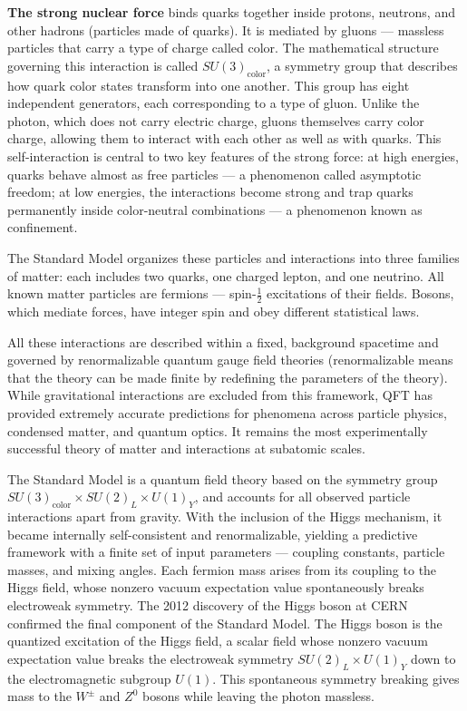 \textbf{The strong nuclear force} binds quarks together inside protons, neutrons, and other hadrons (particles made of quarks). It is mediated by gluons — massless particles that carry a type of charge called color. The mathematical structure governing this interaction is called \(SU(3)_\text{color}\), a symmetry group that describes how quark color states transform into one another. This group has eight independent generators, each corresponding to a type of gluon. Unlike the photon, which does not carry electric charge, gluons themselves carry color charge, allowing them to interact with each other as well as with quarks. This self-interaction is central to two key features of the strong force: at high energies, quarks behave almost as free particles — a phenomenon called asymptotic freedom; at low energies, the interactions become strong and trap quarks permanently inside color-neutral combinations — a phenomenon known as confinement.

The Standard Model organizes these particles and interactions into three families of matter: each includes two quarks, one charged lepton, and one neutrino. All known matter particles are fermions — spin-$\frac{1}{2}$ excitations of their fields. Bosons, which mediate forces, have integer spin and obey different statistical laws.

All these interactions are described within a fixed, background spacetime and governed by renormalizable quantum gauge field theories (renormalizable means that the theory can be made finite by redefining the parameters of the theory). While gravitational interactions are excluded from this framework, QFT has provided extremely accurate predictions for phenomena across particle physics, condensed matter, and quantum optics. It remains the most experimentally successful theory of matter and interactions at subatomic scales.

The Standard Model is a quantum field theory based on the symmetry group $SU(3)_\text{color} \times SU(2)_L \times U(1)_Y$, and accounts for all observed particle interactions apart from gravity. With the inclusion of the Higgs mechanism, it became internally self-consistent and renormalizable, yielding a predictive framework with a finite set of input parameters — coupling constants, particle masses, and mixing angles. Each fermion mass arises from its coupling to the Higgs field, whose nonzero vacuum expectation value spontaneously breaks electroweak symmetry.
The 2012 discovery of the Higgs boson at CERN confirmed the final component of the Standard Model. The Higgs boson is the quantized excitation of the Higgs field, a scalar field whose nonzero vacuum expectation value breaks the electroweak symmetry \(SU(2)_L\times U(1)_Y\) down to the electromagnetic subgroup \(U(1)\). This spontaneous symmetry breaking gives mass to the \(W^\pm\) and \(Z^0\) bosons while leaving the photon massless.

